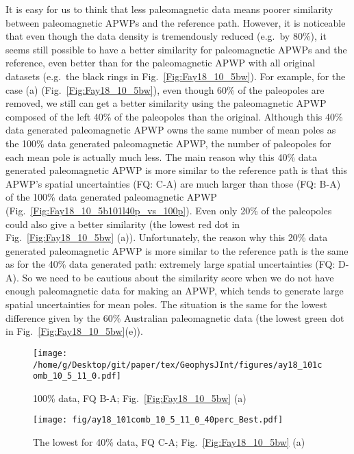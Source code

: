 It is easy for us to think that less paleomagnetic data means poorer similarity
between paleomagnetic APWPs and the reference path. However, it is noticeable
that even though the data density is tremendously reduced (e.g.\ by 80\%), it
seems still possible to have a better similarity for paleomagnetic APWPs and the
reference, even better than for the paleomagnetic APWP with all original
datasets (e.g.\ the black rings in Fig.~\ref{Fig:Fay18_10_5bw}). For example,
for the case (a) (Fig.~\ref{Fig:Fay18_10_5bw}), even though 60\% of the
paleopoles are removed, we still can get a better similarity using the
paleomagnetic APWP composed of the left 40\% of the paleopoles than the
original. Although this 40\% data generated paleomagnetic APWP owns the same
number of mean poles as the 100\% data generated paleomagnetic APWP, the
number of paleopoles for each mean pole is actually much less. The main reason
why this 40\% data generated paleomagnetic APWP is more similar to the
reference path is that this APWP's spatial uncertainties (FQ: C-A) are much
larger than those (FQ: B-A) of the 100\% data generated paleomagnetic APWP
(Fig.~\ref{Fig:Fay18_10_5b101l40p_vs_100p}). Even only 20\% of the paleopoles
could also give a better similarity (the lowest red dot in
Fig.~\ref{Fig:Fay18_10_5bw} (a)). Unfortunately, the reason why this 20\% data
generated paleomagnetic APWP is more similar to the reference path is the same
as for the 40\% data generated path: extremely large spatial uncertainties (FQ:
D-A). So we need to be cautious about the similarity score when we do not have
enough paleomagnetic data for making an APWP, which tends to generate large
spatial uncertainties for mean poles. The situation is the same for the lowest
difference given by the 60\% Australian paleomagnetic data (the lowest green dot
in Fig.~\ref{Fig:Fay18_10_5bw}(e)).

\begin{figure*}[tbp]
  \captionsetup[subfigure]{labelformat=empty,aboveskip=-6pt,belowskip=-6pt}
  \centering
  \begin{subfigure}[htbp]{.49\textwidth}
    \captionsetup{skip=0pt}  %
    \centering
    \texttt{[image: /home/g/Desktop/git/paper/tex/GeophysJInt/figures/ay18\_101comb\_10\_5\_11\_0.pdf]}
	\caption{100\% data, FQ B-A; Fig.~\ref{Fig:Fay18_10_5bw}
	(a)}\label{Fig:Fay18_10_5b101}
  \end{subfigure}
  \begin{subfigure}[htbp]{.49\textwidth}
    \captionsetup{skip=0pt}
    \centering
    \texttt{[image: fig/ay18\_101comb\_10\_5\_11\_0\_40perc\_Best.pdf]}
    \caption{The lowest for 40\% data, FQ C-A;
	Fig.~\ref{Fig:Fay18_10_5bw} (a)}\label{Fig:Fay18_10_5b101l40p}
  \end{subfigure}
  \caption[Less data, better similarity?]{Comparing the 100\% North American
  120 Ma paleomagnetic data derived result with the best of the only
  40\% data (giving even better similarity) derived results (the lowest yellow
  dot in Fig.~\ref{Fig:Fay18_10_5bw} (a)).}\label{Fig:Fay18_10_5b101l40p_vs_100p}
\end{figure*}

